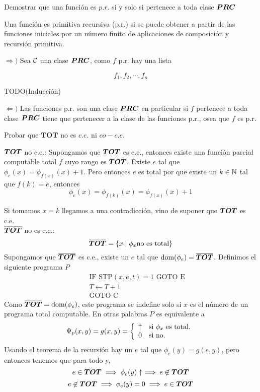 \documentclass[leqno, 12pt, twoside,letterpaper]{book}
\begin{document}
\begin{ej}{5}
    Demostrar que una función es $p.r.$ si y solo si pertenece a toda clase
    $\bm{PRC}$
\end{ej}

\begin{solucion}

\begin{defi} Una función es primitiva recursiva (p.r.) si se puede obtener a partir de las funciones iniciales por un número finito de aplicaciones de composición y recursión primitiva.
\end{defi}

\begin{dem}
$\Rightarrow)$ Sea $\mathcal{C}$ una clase $\bm{PRC}$, como $f$ p.r. hay una lista

	\[ f_1, f_2, \cdots, f_n \]

	TODO(Inducción)

\noindent $\Leftarrow)$ Las funciones p.r. son una clase $\bm{PRC}$ en particular si $f$ pertenece a toda clase $\bm{PRC}$ tiene que pertenecer a la clase de las funciones p.r., osea que $f$ es p.r.
\end{dem}
\end{solucion}

\begin{ej}{4}
    Probar que $\bm{TOT}$ no es $c.e.$ ni $co-c.e.$
\end{ej}

\begin{solucion}

$\bm{TOT}$ no c.e.: Supongamos que $\bm{TOT}$ es c.e., entonces existe una función parcial computable total $f$ cuyo rango es $\bm{TOT}$. Existe $e$ tal que $\phi_{e}(x) = \phi_{f(x)}(x) + 1$. Pero entonces $e$ es total por que existe un $k \in \mathbb{N}$ tal que $f(k) = e$, entonces
\[ \phi_{e}(x) = \phi_{f(k)}(x) = \phi_{f(x)}(x) + 1 \]

\noindent Si tomamos $x = k$ llegamos a una contradicción, vino de suponer que $\bm{TOT}$ es c.e. \\

\noindent $\bm{\overline{TOT}}$ no es c.e.: \[\bm{\overline{TOT}} = \{ x \mid \phi_x \mbox{no es total} \}\]
Supongamos que $\bm{\overline{TOT}}$ es c.e., existe un $e$ tal que $\mbox{dom}(\phi_{e}) = \bm{\overline{TOT}}$.
Definimos el siguiente programa $P$
\begin{align*}
	[C] \quad & \mbox{IF STP}(x, e, t) = 1 \mbox{ GOTO E} \\
		\quad & T \leftarrow T + 1 \\
		\quad & \mbox{GOTO C}
\end{align*}
\noindent Como $\bm{\overline{TOT}} = \mbox{dom}(\phi_e)$, este programa se indefine solo si $x$ es el número de un programa total computable. En otras palabras $P$ es equivalente a
\[ \Psi_{p}(x, y) = g(x, y) = \left\{ \begin{array}{ll} \uparrow & \mbox{si } \phi_x \mbox{ es total.} \\ 0 & \mbox{} \mbox{si no.} \end{array} \right.\]
\noindent Usando el teorema de la recursión hay un $e$ tal que $\phi_e(y) = g(e, y)$, pero entonces tenemos que para todo y,
 \[ e \in \bm{TOT} \implies  \phi_e(y) \uparrow \implies e \not\in \bm{TOT} \]
 \[ e \not\in \bm{TOT} \implies \phi_e(y) = 0 \implies e \in\bm{TOT} \]
\end{solucion}
\end{document}
